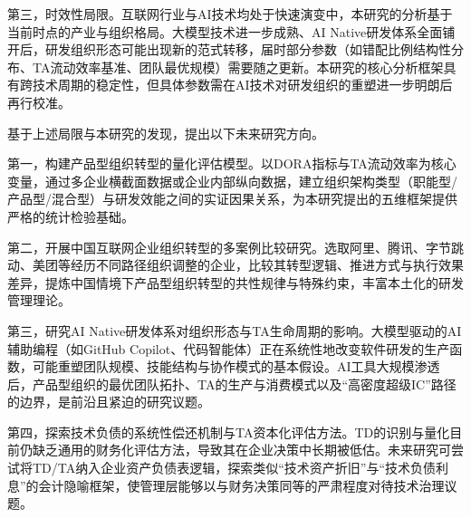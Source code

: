 第三，时效性局限。互联网行业与AI技术均处于快速演变中，本研究的分析基于当前时点的产业与组织格局。大模型技术进一步成熟、AI Native研发体系全面铺开后，研发组织形态可能出现新的范式转移，届时部分参数（如错配比例结构性分布、TA流动效率基准、团队最优规模）需要随之更新\cite{li2024scientific,zheng2021disruptive}。本研究的核心分析框架具有跨技术周期的稳定性，但具体参数需在AI技术对研发组织的重塑进一步明朗后再行校准。

基于上述局限与本研究的发现，提出以下未来研究方向。

第一，构建产品型组织转型的量化评估模型。以DORA指标与TA流动效率为核心变量，通过多企业横截面数据或企业内部纵向数据，建立组织架构类型（职能型/产品型/混合型）与研发效能之间的实证因果关系，为本研究提出的五维框架提供严格的统计检验基础。

第二，开展中国互联网企业组织转型的多案例比较研究。选取阿里、腾讯、字节跳动、美团等经历不同路径组织调整的企业，比较其转型逻辑、推进方式与执行效果差异，提炼中国情境下产品型组织转型的共性规律与特殊约束，丰富本土化的研发管理理论。

第三，研究AI Native研发体系对组织形态与TA生命周期的影响。大模型驱动的AI辅助编程（如GitHub Copilot、代码智能体）正在系统性地改变软件研发的生产函数，可能重塑团队规模、技能结构与协作模式的基本假设\cite{li2024scientific,pan2021transforming}。AI工具大规模渗透后，产品型组织的最优团队拓扑、TA的生产与消费模式以及“高密度超级IC”路径的边界，是前沿且紧迫的研究议题。

第四，探索技术负债的系统性偿还机制与TA资本化评估方法。TD的识别与量化目前仍缺乏通用的财务化评估方法，导致其在企业决策中长期被低估。未来研究可尝试将TD/TA纳入企业资产负债表逻辑，探索类似“技术资产折旧”与“技术负债利息”的会计隐喻框架，使管理层能够以与财务决策同等的严肃程度对待技术治理议题\cite{cunningham1993wycash,kruchten2012technical,seaman2014measuring}。
